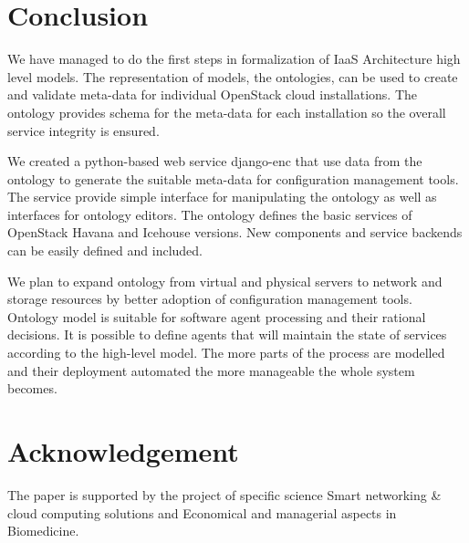 
\section{Conclusion}

We have managed to do the first steps in formalization of IaaS Architecture high level models. The representation of models, the ontologies, can be used to create and validate meta-data for individual OpenStack cloud installations. The ontology provides schema for the meta-data for each installation so the overall service integrity is ensured.

We created a python-based web service django-enc that use data from the ontology to generate the suitable meta-data for configuration management tools. The service provide simple interface for manipulating the ontology as well as interfaces for ontology editors. The ontology defines the basic services of OpenStack Havana and Icehouse versions. New components and service backends can be easily defined and included.



We plan to expand  ontology from virtual and physical servers to network and storage resources by better adoption of configuration management tools. Ontology model is suitable for software agent processing and their rational decisions. It is possible to define agents that will maintain the state of services according to the high-level model. The more parts of the process are modelled and their deployment automated the more manageable the whole system becomes.

\section{Acknowledgement}

The paper is supported by the project of specific science Smart networking \& cloud computing solutions and Economical and managerial aspects in Biomedicine.
